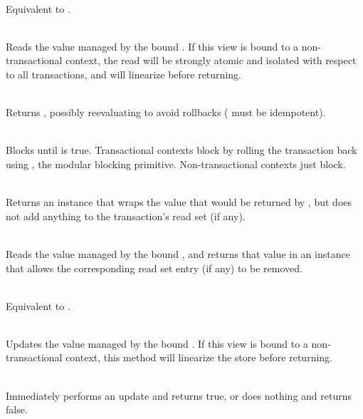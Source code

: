 {
\setlength{\leftskip}{12pt}
\setlength{\parindent}{-12pt}
\setlength{\parskip}{3pt}

\vspace{2pt}

\\ Equivalent to .

\\ Reads the value managed by the
bound .  If this view is bound to a non-transactional context,
the read will be strongly atomic and isolated with respect to all
transactions, and will linearize before returning.

\code{map[}\code{](f: }\code{ => }\code{): }\\
Returns , possibly reevaluating 
to avoid rollbacks ( must be idempotent).

\code{ => }\code{) }\\ Blocks
until  is true.  Transactional contexts block by rolling
the transaction back using , the modular blocking primitive.
Non-transactional contexts just block.

\code{[}\code{] }\\
Returns an instance that wraps the value that would be returned by
, but does not add anything to the transaction's read set
(if any).

\code{[}\code{] }\\
Reads the value managed by the bound , and returns that
value in an instance that allows the corresponding read set entry (if any)
to be removed.

\vspace{3pt}

\code{) }\\ Equivalent to .

\code{) }\\ Updates the value managed by the
bound .  If this view is bound to a non-transactional context,
this method will linearize the store before returning.

\code{): }\\ Immediately
performs an update and returns true, or does nothing and returns false.

}

